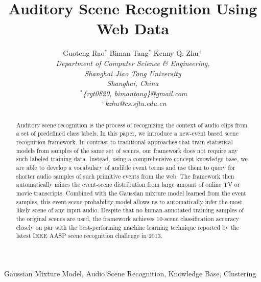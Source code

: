 \documentclass{acm_proc_article-sp}
\newcommand{\tab}{\hspace*{2ex}}
\begin{document}
\title{Auditory Scene Recognition Using Web Data}
\author{
Guoteng Rao$^*$ \tab Biman Tang$^*$ \tab Kenny Q. Zhu$^{+}$
\vspace{1.6mm}\\
\fontsize{10}{10}\selectfont\itshape
Department of Computer Science \& Engineering,\\
\fontsize{10}{10}\selectfont\itshape
Shanghai Jiao Tong University\\
\fontsize{10}{10}\selectfont\itshape
Shanghai, China\\
\fontsize{10}{10}\selectfont\ttfamily\upshape
$~^{*}$\{rgt0820, bimantang\}@gmail.com\\
\fontsize{10}{10}\selectfont\ttfamily\upshape
$~^{+}$kzhu@cs.sjtu.edu.cn
}

\maketitle

\begin{abstract}
Auditory scene recognition is the process of recognizing 
the context of audio clips from a set of predefined class labels. 
In this paper, we introduce a new-event based scene recognition framework.
In contrast to traditional approaches that train statistical models from
samples of the same set of scenes, our framework does not require any such
labeled training data. Instead, using a comprehensive concept knowledge base,
we are able to develop a vocabulary of audible event terms and use them to
query for shorter audio samples of such primitive events from the web.
The framework then automatically mines the event-scene distribution from 
large amount of online TV or movie transcripts. Combined with the Gaussian
mixture model learned from the event samples, this event-scene 
probability model allows us to automatically infer the most likely 
scene of any input audio. Despite that no human-annotated
training samples of the original
scenes are used, the framework achieves 10-scene classification accuracy 
closely on par with the best-performing machine learning technique reported 
by the latest IEEE AASP scene recognition challenge in 2013.
\end{abstract}

\begin{keywords}
Gaussian Mixture Model, Audio Scene Recognition, Knowledge Base, Clustering
\end{keywords}











\end{document}

